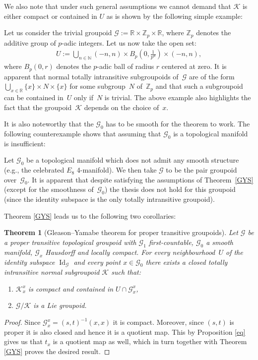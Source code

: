 \documentclass[pdftex]{sigma}
\newtheorem{tw}{Theorem}[section]
\begin{document}
We also note that under such general assumptions we cannot demand that $\mathcal{K}$ is either compact or contained in $U$ as is shown by the following simple example:
\begin{egg}
Let us consider the trivial groupoid $\mathcal{G}:=\mathbb{R}\times\mathbb{Z}_p\times\mathbb{R}$, where $\mathbb{Z}_p$ denotes the additive group of $p$-adic integers. Let us now take the open set:
\begin{gather*}
 U:=\bigcup\limits_{n\in\mathbb{N}} (-n,n)\times B_p\left(0,\frac{1}{p^n}\right)\times (-n,n),
\end{gather*}
where $ B_p(0,r)$ denotes the $p$-adic ball of radius $r$ centered at zero. It is apparent that normal totally intransitive subgroupoids of~$\mathcal{G}$ are of the form $\bigcup\limits_{x\in\mathbb{R}} \{x\}\times N\times \{x\}$ for some subgroup~$N$ of~$\mathbb{Z}_p$ and that such a subgroupoid can be contained in~$U$ only if~$N$ is trivial. The above example also highlights the fact that the groupoid~$\mathcal{K}$ depends on the choice of~$x$.
\end{egg}

It is also noteworthy that the $\mathcal{G}_0$ has to be smooth for the theorem to work. The following counterexample shows that assuming that $\mathcal{G}_0$ is a topological manifold is insufficient:
\begin{egg} Let $\mathcal{G}_0$ be a topological manifold which does not admit any smooth structure (e.g., the celebrated $E_8$ 4-manifold). We then take $\mathcal{G}$ to be the pair groupoid over~$\mathcal{G}_0$. It is apparent that despite satisfying the assumptions of Theorem~\ref{GYS} (except for the smoothness of~$\mathcal{G}_0$) the thesis does not hold for this groupoid (since the identity subspace is the only totally intransitive groupoid).
\end{egg}

Theorem \ref{GYS} leads us to the following two corollaries:
\begin{tw}[Gleason--Yamabe theorem for proper transitive groupoids] Let $\mathcal{G}$ be a proper transitive topological groupoid with $\mathcal{G}_1$ first-countable, $\mathcal{G}_0$ a smooth manifold, $\mathcal{G}_x$ Hausdorff and locally compact. For every neighbourhood~$U$ of the identity subspace $\operatorname{Id}_{\mathcal{G}}$ and every point $x\in\mathcal{G}_0$ there exists a closed totally intransitive normal subgroupoid $\mathcal{K}$ such that:
\begin{enumerate}\itemsep=0pt
\item[$1)$] $\mathcal{K}^x_x$ is compact and contained in $U\cap\mathcal{G}^x_x$,
\item[$2)$] $\mathcal{G}\slash\mathcal{K}$ is a Lie groupoid.
\end{enumerate}
\end{tw}
\begin{proof} Since $\mathcal{G}^x_x=(s,t)^{-1}(x,x)$ it is compact. Moreover, since $(s,t)$ is proper it is also closed and hence it is a quotient map. This by Proposition \ref{eq} gives us that $t_x$ is a quotient map as well, which in turn together with Theorem \ref{GYS} proves the desired result.
\end{proof}
\end{document}
